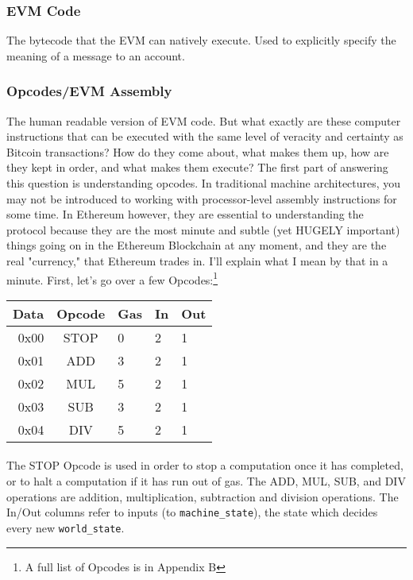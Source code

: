 \documentclass[10pt,a4paper,leqno,bibliography=totoc]{scrartcl}
\newenvironment{alphafootnotes}
{\par\edef\savedfootnotenumber{\number\value{footnote}}
\renewcommand{\thefootnote}{\alph{footnote}}
\setcounter{footnote}{0}}
{\par\setcounter{footnote}{\savedfootnotenumber}}
\begin{document}
\begin{alphafootnotes}
\begin{multicols*}{2}
			\subsubsection{EVM Code}
				The bytecode that the EVM can natively execute. Used to explicitly specify the meaning of a message to an account.
			\subsubsection{Opcodes/EVM Assembly}
		The human readable version of EVM code. But what exactly are these computer instructions that can be executed with the same level of veracity and certainty as Bitcoin transactions? How do they come about, what makes them up, how are they kept in order, and what makes them execute? The first part of answering this question is understanding opcodes. In traditional machine architectures, you may not be introduced to working with processor-level assembly instructions for some time. In Ethereum however, they are essential to understanding the protocol because they are the most minute and subtle (yet HUGELY important) things going on in the Ethereum Blockchain at any moment, and they are the real "currency," that Ethereum trades in. I'll explain what I mean by that in a minute. First, let's go over a few Opcodes:\footnote{A full list of Opcodes is in Appendix B} \\

\begin{tabular}{|rclll|}
	\hline
	\textbf{Data} & \textbf{Opcode} & \textbf{Gas} & \textbf{In} & \textbf{Out}  \\
	\hline
	0x00 & STOP & 0 & 2 & 1 \\
	0x01 & ADD & 3 & 2 & 1 \\
	0x02 & MUL & 5 & 2 & 1 \\
	0x03 & SUB & 3 & 2 & 1 \\
	0x04 & DIV & 5 & 2 & 1 \\ 
	\hline
\end{tabular}

				\paragraph{}The STOP Opcode is used in order to stop a computation once it has completed, or to halt a computation if it has run out of gas. The ADD, MUL, SUB, and DIV operations are addition, multiplication, subtraction and division operations. The In/Out columns refer to inputs (to \texttt{machine\_state}), the state which decides every new \texttt{world\_state}. 


\end{multicols*}
\end{alphafootnotes}
\end{document}
